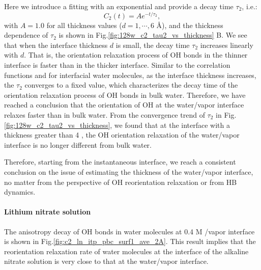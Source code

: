 Here we introduce a fitting with an exponential and provide a decay time $\tau_2$, i.e.: 
\begin{equation}
C_2(t)=Ae^{-t/\tau_2},
\label{eq:c2_single_exponential}
\end{equation}
with $A= 1.0$ for all thickness values ($d=1,\cdots, 6$ \AA), and the thickness dependence of $\tau_2$ is shown in Fig.\thinspace\ref{fig:128w_c2_tau2_vs_thickness} B.
We see that when the interface thickness $d$ is small, the decay time $\tau_2$ increases linearly with $d$. 
That is, the orientation relaxation process of OH bonds in the thinner interface is faster than in the thicker interface.
Similar to the correlation functions \CHB and \SHB for interfacial water molecules, as the interface thickness increases, the $\tau_2$ converges to a fixed value,
which characterizes the decay time of the orientation relaxation process of OH bonds in bulk water. 
Therefore, we have reached a conclusion that the orientation of OH at the water/vapor interface relaxes faster than in bulk water. 
From the convergence trend of $\tau_2$ in Fig.\thinspace\ref{fig:128w_c2_tau2_vs_thickness}, 
we found that at the interface with a thickness greater than 4 \A, the OH orientation relaxation of the water/vapor interface is no longer different from bulk water. 

Therefore, starting from the instantaneous interface, we reach a consistent conclusion on the issue of estimating the thickness of the water/vapor interface, 
no matter from the perspective of OH reorientation relaxation or from HB dynamics.

\paragraph{Lithium nitrate solution}
The anisotropy decay of OH bonds in water molecules at 0.4 M \LiN/vapor interface is shown in Fig.\thinspace\ref{fig:c2_ln_itp_pbc_surf1_ave_2A}.  
This result implies that the reorientation relaxation rate of water molecules at the interface of the alkaline nitrate solution 
is very close to that at the water/vapor interface.

